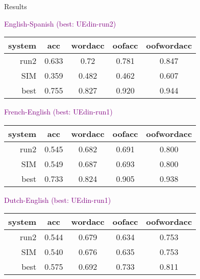 \documentclass[final,t]{beamer}
\begin{document}
\begin{frame}{}
\begin{columns}
\begin{column}{.64\linewidth}
\begin{block}{Results}
\begin{center}
  \textcolor{purple}{English-Spanish (best: UEdin-run2)}
  \begin{center}
  \begin{tabular}{|r|c|c|c|c|}
    \hline
    system & acc      & wordacc  & oofacc & oofwordacc \\
    \hline
    run2  &  0.633 & 0.72 & 0.781 & 0.847 \\
    SIM    &  0.359 &  0.482 & 0.462 & 0.607 \\
    best   &  0.755 & 0.827   & 0.920  & 0.944 \\
    \hline
  \end{tabular}
  \end{center}

 \textcolor{purple}{French-English (best: UEdin-run1)}
  \begin{center}
  \begin{tabular}{|r|c|c|c|c|}
    \hline
    system & acc      & wordacc  & oofacc & oofwordacc \\
    \hline
    run2  & 0.545  & 0.682 & 0.691 & 0.800 \\
    SIM        &  0.549 & 0.687 & 0.693 & 0.800 \\
    best & 0.733 & 0.824 & 0.905 & 0.938 \\
    \hline
  \end{tabular}
  \end{center}

  \textcolor{purple}{Dutch-English (best: UEdin-run1)}
  \begin{center}
  \begin{tabular}{|r|c|c|c|c|}
    \hline
    system & acc      & wordacc  & oofacc & oofwordacc \\
    \hline
    run2        &  0.544      &  0.679  & 0.634   & 0.753    \\
    SIM              &  0.540      &  0.676  & 0.635   & 0.753    \\
    best       &  0.575   & 0.692  & 0.733      &  0.811 \\
    \hline
  \end{tabular}
  \end{center}


\end{center}
\end{block}
\end{column}
\end{columns}
\end{frame}
\end{document}
